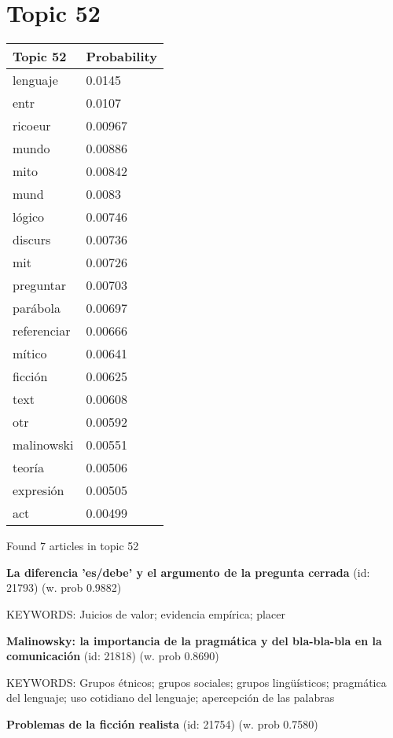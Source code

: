 \documentclass{article}
\begin{document}
\section*{Topic 52}\vfill
\begin{tabular}{ll}
\toprule
    Topic 52 & Probability \\
\midrule
    lenguaje &      0.0145 \\
        entr &      0.0107 \\
     ricoeur &     0.00967 \\
       mundo &     0.00886 \\
        mito &     0.00842 \\
        mund &      0.0083 \\
      lógico &     0.00746 \\
     discurs &     0.00736 \\
         mit &     0.00726 \\
   preguntar &     0.00703 \\
    parábola &     0.00697 \\
 referenciar &     0.00666 \\
      mítico &     0.00641 \\
     ficción &     0.00625 \\
        text &     0.00608 \\
         otr &     0.00592 \\
  malinowski &     0.00551 \\
      teoría &     0.00506 \\
   expresión &     0.00505 \\
         act &     0.00499 \\
\bottomrule
\end{tabular}

\vfill
Found 7 articles in topic 52
\vfill

\textbf{La diferencia 'es/debe' y el argumento de la pregunta cerrada} (id: 21793)
 (w. prob 0.9882)


KEYWORDS:
Juicios de valor; evidencia empírica; placer
\vfill

\textbf{Malinowsky: la importancia de la pragmática y del bla-bla-bla en la comunicación} (id: 21818)
 (w. prob 0.8690)


KEYWORDS:
Grupos étnicos; grupos sociales; grupos lingüísticos; pragmática del lenguaje; uso cotidiano del lenguaje; apercepción de las palabras
\vfill

\textbf{Problemas de la ficción realista} (id: 21754)
 (w. prob 0.7580)
\end{document}
